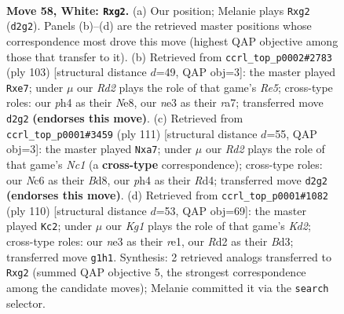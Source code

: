 \documentclass[11pt]{article}
\begin{document}
\clearpage

\begin{figure}[p]\centering
\begin{subfigure}{0.46\textwidth}\centering
\resizebox{\linewidth}{!}{%
\newchessgame
\chessboard[
  setfen={1r6/2R5/2Np1k2/8/6pp/1p2n3/3R2r1/6K1 w - - 0 58},
  showmover=false,
  pgfstyle=straightmove, color=movearrow, markmove={d2-g2}
]}
\caption{}
\end{subfigure}\hfill
\begin{subfigure}{0.46\textwidth}\centering
\resizebox{\linewidth}{!}{%
\newchessgame
\chessboard[
  setfen={4n1k1/R3R3/6p1/8/P2Nr3/KP6/6r1/8 b - - 8 52},
  showmover=false,
  pgfstyle=straightmove, color=movearrow, markmove={e4-e7}
]}
\caption{}
\end{subfigure}
\\[4pt]
\begin{subfigure}{0.46\textwidth}\centering
\resizebox{\linewidth}{!}{%
\newchessgame
\chessboard[
  setfen={1Rnb4/R2N4/4p3/1P2Pk2/3r4/8/7p/7K b - - 0 56},
  showmover=false,
  pgfstyle=straightmove, color=movearrow, markmove={c8-a7}
]}
\caption{}
\end{subfigure}\hfill
\begin{subfigure}{0.46\textwidth}\centering
\resizebox{\linewidth}{!}{%
\newchessgame
\chessboard[
  setfen={1k6/1p4R1/3Np3/p6p/3P4/3B3P/3K4/3rr3 w - - 9 56},
  showmover=false,
  pgfstyle=straightmove, color=movearrow, markmove={d2-c2}
]}
\caption{}
\end{subfigure}
\caption{\textbf{Move 58, White: \texttt{Rxg2}.} (a) Our position; Melanie plays \texttt{Rxg2} (\texttt{d2g2}). Panels (b)--(d) are the retrieved master positions whose correspondence most drove this move (highest QAP objective among those that transfer to it). (b) Retrieved from \texttt{ccrl\_top\_p0002\#2783} (ply 103) [structural distance $d$=49, QAP obj=3]: the master played \texttt{Rxe7}; under $\mu$ our \emph{Rd2} plays the role of that game's \emph{Re5}; cross-type roles: our \emph{p}h4 as their \emph{N}e8, our \emph{n}e3 as their \emph{r}a7; transferred move \texttt{d2g2} \textbf{(endorses this move)}. (c) Retrieved from \texttt{ccrl\_top\_p0001\#3459} (ply 111) [structural distance $d$=55, QAP obj=3]: the master played \texttt{Nxa7}; under $\mu$ our \emph{Rd2} plays the role of that game's \emph{Nc1} (a \textbf{cross-type} correspondence); cross-type roles: our \emph{N}c6 as their \emph{B}d8, our \emph{p}h4 as their \emph{R}d4; transferred move \texttt{d2g2} \textbf{(endorses this move)}. (d) Retrieved from \texttt{ccrl\_top\_p0001\#1082} (ply 110) [structural distance $d$=53, QAP obj=69]: the master played \texttt{Kc2}; under $\mu$ our \emph{Kg1} plays the role of that game's \emph{Kd2}; cross-type roles: our \emph{n}e3 as their \emph{r}e1, our \emph{R}d2 as their \emph{B}d3; transferred move \texttt{g1h1}. Synthesis: 2 retrieved analogs transferred to \texttt{Rxg2} (summed QAP objective 5, the strongest correspondence among the candidate moves); Melanie committed it via the \texttt{search} selector.}
\label{fig:thought-m114}
\end{figure}
\end{document}
